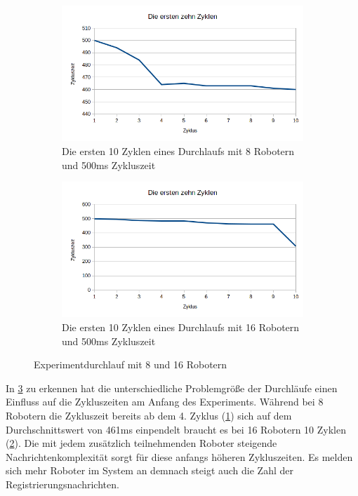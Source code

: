 \begin{figure}[h]
 \begin{subfigure}{.5\textwidth}
  \centering
  \includegraphics[width=\linewidth]{../evaluation_results/8_500_first10.png}
  \caption{Die ersten 10 Zyklen eines Durchlaufs mit 8 Robotern und 500ms Zykluszeit}
  \label{fig:eval_8_first10}
 \end{subfigure}
 \begin{subfigure}{.5\textwidth}
  \centering
  \includegraphics[width=\linewidth]{../evaluation_results/16_500_first10.png}
  \caption{Die ersten 10 Zyklen eines Durchlaufs mit 16 Robotern und 500ms Zykluszeit}
  \label{fig:eval_16_first10}
 \end{subfigure}
 \caption{Experimentdurchlauf mit 8 und 16 Robotern}
 \label{fig:eval_8_16_first10}
\end{figure}

In \ref{fig:eval_8_16_first10} zu erkennen hat die unterschiedliche Problemgröße der Durchläufe einen Einfluss
auf die Zykluszeiten am Anfang des Experiments. Während bei 8 Robotern die Zykluszeit bereits ab dem 4. Zyklus
(\ref{fig:eval_8_first10}) sich auf dem Durchschnittswert von 461ms einpendelt braucht es bei 16 Robotern
10 Zyklen (\ref{fig:eval_16_first10}). Die mit jedem zusätzlich teilnehmenden Roboter steigende
Nachrichtenkomplexität sorgt für diese anfangs höheren Zykluszeiten. Es melden sich mehr Roboter im System an
demnach steigt auch die Zahl der Registrierungsnachrichten.

